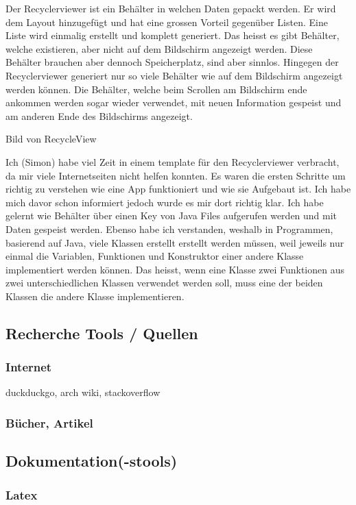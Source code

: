 \documentclass[a4paper,11pt]{article}
\begin{document}
Der Recyclerviewer ist ein Behälter in welchen Daten gepackt werden. Er wird dem Layout hinzugefügt und hat eine grossen Vorteil gegenüber Listen. 
Eine Liste wird einmalig erstellt und komplett generiert. Das heisst es gibt Behälter, welche existieren, aber nicht auf dem Bildschirm angezeigt werden. 
Diese Behälter brauchen aber dennoch Speicherplatz, sind aber sinnlos. Hingegen der Recyclerviewer generiert nur so viele Behälter wie auf dem Bildschirm angezeigt werden können. 
Die Behälter, welche beim Scrollen am Bildschirm ende ankommen werden sogar wieder verwendet, mit neuen Information gespeist und am anderen Ende des Bildschirms angezeigt.

Bild von RecycleView

Ich (Simon) habe viel Zeit in einem template für den Recyclerviewer verbracht, da mir viele Internetseiten nicht helfen konnten. Es waren die ersten Schritte um 
richtig zu verstehen wie eine App funktioniert und wie sie Aufgebaut ist. Ich habe mich davor schon informiert jedoch wurde es mir dort richtig klar. Ich habe gelernt
wie Behälter über einen Key von Java Files aufgerufen werden und mit Daten gespeist werden. Ebenso habe ich verstanden, weshalb in Programmen, basierend auf Java, viele 
Klassen erstellt erstellt werden müssen, weil jeweils nur einmal die Variablen, Funktionen und Konstruktor einer andere Klasse implementiert werden können. Das heisst, 
wenn eine Klasse zwei Funktionen aus zwei unterschiedlichen Klassen verwendet werden soll, muss eine der beiden Klassen die andere Klasse implementieren. 

\subsection{Recherche Tools / Quellen}
\subsubsection{Internet}
duckduckgo, arch wiki, stackoverflow
\subsubsection{Bücher, Artikel}

\subsection{Dokumentation(-stools)}
\subsubsection{Latex}
\end{document}
